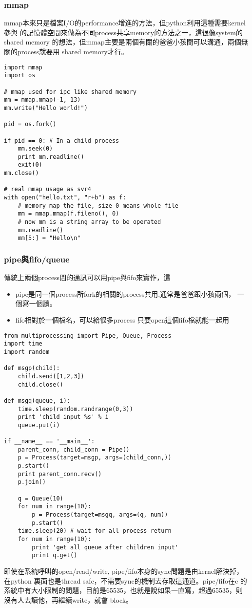   \subsubsection{mmap}
  mmap本來只是檔案I/O的performance增進的方法，但python利用這種需要kernel參與
  的記憶體空間來做為不同process共享memory的方法之一，這很像system的shared memory
  的想法，但mmap主要是兩個有關的爸爸小孩間可以溝通，兩個無關的process就要用
  shared memory才行。
  \begin{verbatim}
import mmap
import os

# mmap used for ipc like shared memory
mm = mmap.mmap(-1, 13)
mm.write("Hello world!")

pid = os.fork()

if pid == 0: # In a child process
    mm.seek(0)
    print mm.readline()
    exit(0)
mm.close()

# real mmap usage as svr4
with open("hello.txt", "r+b") as f:
    # memory-map the file, size 0 means whole file
    mm = mmap.mmap(f.fileno(), 0)
    # now mm is a string array to be operated
    mm.readline()
    mm[5:] = "Hello\n"
  \end{verbatim}
    \subsubsection{pipe與fifo/queue}
    傳統上兩個process間的通訊可以用pipe與fifo來實作，這
    \begin{itemize}
      \item pipe是同一個process所fork的相關的process共用,通常是爸爸跟小孩兩個，
        一個寫一個讀。
      \item fifo相對於一個檔名，可以給很多process 只要open這個fifo檔就能一起用
    \end{itemize}
    \begin{verbatim}
from multiprocessing import Pipe, Queue, Process
import time
import random

def msgp(child):
    child.send([1,2,3])
    child.close()

def msgq(queue, i):
    time.sleep(random.randrange(0,3))
    print 'child input %s' % i
    queue.put(i)

if __name__ == '__main__':
    parent_conn, child_conn = Pipe()
    p = Process(target=msgp, args=(child_conn,))
    p.start()
    print parent_conn.recv()
    p.join()

    q = Queue(10)
    for num in range(10):
        p = Process(target=msgq, args=(q, num))
        p.start()
    time.sleep(20) # wait for all process return
    for num in range(10):
        print 'get all queue after children input'
        print q.get()
    \end{verbatim}
    即使在系統呼叫的open/read/write, pipe/fifo本身的sync問題是由kernel解決掉，
    在python 裏面也是thread safe，不需要sync的機制去存取這通道。pipe/fifo在c
    的系統中有大小限制的問題，目前是65535，也就是說如果一直寫，超過65535，則
    沒有人去讀他，再繼續write，就會 block。

